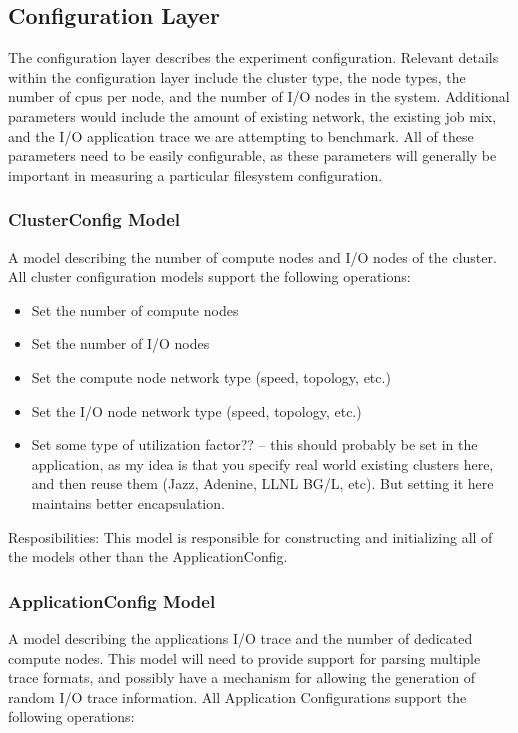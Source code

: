 \documentclass[11pt]{article}
\begin{document}
\subsection{Configuration Layer}
The configuration layer describes the experiment configuration.  Relevant
details within the configuration layer include the cluster type, the node
types, the number of cpus per node, and the number of I/O nodes in the system.
Additional parameters would include the amount of existing network, the
existing job mix, and the I/O application trace we are attempting to
benchmark.  All of these parameters need to be easily configurable, as these
parameters will generally be important in measuring a particular filesystem
configuration.

\subsubsection{ClusterConfig Model}
A model describing the number of compute nodes and I/O nodes of the cluster.
All cluster configuration models support the following operations:

\begin{itemize}
\item Set the number of compute nodes
\item Set the number of I/O nodes
\item Set the compute node network type (speed, topology, etc.)
\item Set the I/O node network type (speed, topology, etc.)
\item Set some type of utilization factor?? -- this should probably be set in
  the application, as my idea is that you specify real world existing clusters
  here, and then reuse them (Jazz, Adenine, LLNL BG/L, etc).  But setting it
  here maintains better encapsulation.
\end{itemize}

Resposibilities:  This model is responsible for constructing and initializing
all of the models other than the ApplicationConfig.
  
\subsubsection{ApplicationConfig Model}
A model describing the applications I/O trace and the number of dedicated
compute nodes.  This model will need to provide support for parsing multiple
trace formats, and possibly have a mechanism for allowing the generation of
random I/O trace information.  All Application Configurations support the
following operations:
\end{document}
